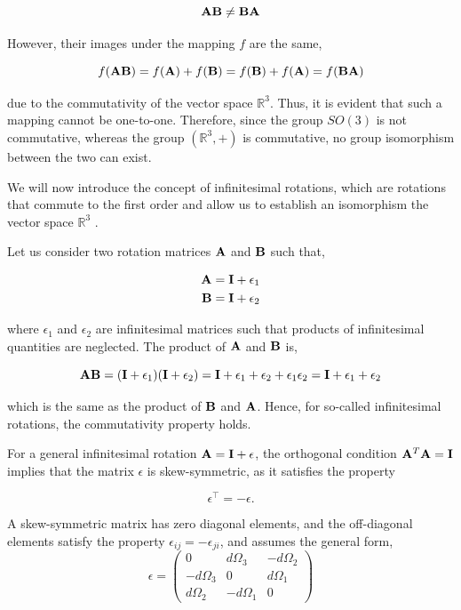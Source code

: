 \documentclass[12pt]{article}
\begin{document}
\[
  \vb{A}\vb{B} \neq \vb{B}\vb{A}
\]

However, their images under the mapping $f$ are the same,

\[
  f(\vb{A}\vb{B}) = f(\vb{A}) + f(\vb{B}) = f(\vb{B}) + f(\vb{A}) = f(\vb{B}\vb{A})
\]

due to the commutativity of the vector space $\mathbb{R}^3$. Thus, it is evident that such a
mapping cannot be one-to-one. Therefore, since the group $SO(3)$ is not commutative, whereas the group
$(\mathbb{R}^3,+)$ is commutative, no group isomorphism between the two can exist. \par


We will now introduce the concept of infinitesimal
rotations, which are rotations that commute to the first order and allow us to establish an isomorphism 
the vector space $\mathbb{R}^3$ .

Let us consider two rotation matrices $\vb{A}$ and $\vb{B}$ such that,

\begin{align}
  \vb{A} &= \vb{I} + \epsilon_1 \\
  \vb{B} &= \vb{I} + \epsilon_2
\end{align}

where $\epsilon_1$ and $\epsilon_2$ are infinitesimal matrices such that
products of infinitesimal quantities are neglected. The product of $\vb{A}$ and $\vb{B}$
is,

\[
  \vb{A}\vb{B} = (\vb{I}+\epsilon_1)(\vb{I}+\epsilon_2) = \vb{I} + \epsilon_1 + \epsilon_2 + \epsilon_1\epsilon_2 = \vb{I} + \epsilon_1 + \epsilon_2
\]

which is the same as the product of $\vb{B}$ and $\vb{A}$. Hence, for so-called infinitesimal
rotations, the commutativity property holds.

For a general infinitesimal rotation $\vb{A} = \vb{I} + \epsilon$, the orthogonal condition
$\vb{A}^T\vb{A} = \vb{I}$ implies that the matrix $\epsilon$ is skew-symmetric, as it
satisfies the property

\[
  \epsilon^\top = -\epsilon.
\]

A skew-symmetric matrix has zero diagonal elements, and the off-diagonal elements satisfy the
property $\epsilon_{ij} = -\epsilon_{ji}$, and assumes the general form,
\[
  \epsilon =
  \begin{pmatrix}
    0           &  d\Omega_3 & -d\Omega_2 \\
    -d\Omega_3  &  0         &  d\Omega_1 \\
    d\Omega_2   & -d\Omega_1 &  0
  \end{pmatrix}
\]
\end{document}
